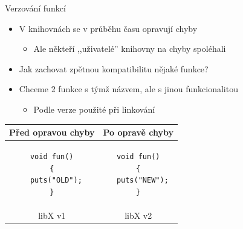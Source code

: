 \begin{frame}[fragile]{Verzování funkcí}

  \begin{itemize}
    \item V knihovnách se v průběhu času opravují chyby

    \pause

    \begin{itemize}
      \item Ale někteří ,,uživatelé'' knihovny na chyby spoléhali
    \end{itemize}

    \pause

    \item Jak zachovat zpětnou kompatibilitu nějaké funkce?

    \pause

    \item Chceme 2 funkce s týmž názvem, ale s jinou funkcionalitou
    \begin{itemize}
      \item Podle verze použité při linkování
    \end{itemize}
  \end{itemize}

  \smallskip
  \pause

  \begin{center}
    \begin{tabular}{|c|c|} \hline
      \footnotesize{\textbf{Před opravou chyby}} & \footnotesize{\textbf{Po opravě chyby}} \\ \hline
      \begin{lstlisting}
void fun()
{
  puts("OLD");
}
      \end{lstlisting} &
      \begin{lstlisting}
void fun()
{
  puts("NEW");
}
      \end{lstlisting} \\ \hline
      \footnotesize{libX v1} & \footnotesize{libX v2} \\ \hline
    \end{tabular}

    \pause
    \smallskip
    \bigskip

  \end{center}

\end{frame}


